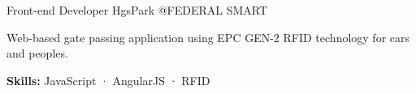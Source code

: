 \begin{cventries}
  \cventry
    {Front-end Developer} %
    {HgsPark} %
    {@FEDERAL SMART} %
    {}
    {
      \begin{cvitems} %
        \item {Web-based gate passing application using EPC GEN-2 RFID technology for cars and peoples.}
        \item {\textbf {Skills:} JavaScript · AngularJS · RFID}
      \end{cvitems}
    }

\end{cventries}
